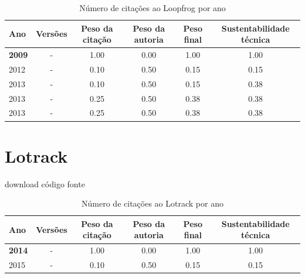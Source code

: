 \begin{table}[H]
\caption{Número de citações ao Loopfrog por ano}
\centering
\begin{tabular}{| l | c | c | c | c | c |}
  \hline
  Ano & Versões & Peso da citação & Peso da autoria & Peso final & Sustentabilidade técnica \\
  \hline
            {\bf 2009}
          &
          -
          &
          1.00
          &
          0.00
          &
          1.00
          &
            {\color{blue} 1.00}
          \\
\hline
            2012
          &
          -
          &
          0.10
          &
          0.50
          &
          0.15
          &
            {\color{red} 0.15}
          \\
\hline
            2013
          &
          -
          &
          0.10
          &
          0.50
          &
          0.15
          &
            {\color{red} 0.38}
          \\
            2013
          &
          -
          &
          0.25
          &
          0.50
          &
          0.38
          &
            {\color{red} 0.38}
          \\
            2013
          &
          -
          &
          0.25
          &
          0.50
          &
          0.38
          &
            {\color{red} 0.38}
          \\
\hline
\end{tabular}
\end{table}



\section{Lotrack}
\checkmark download
\checkmark código fonte


\begin{table}[H]
\caption{Número de citações ao Lotrack por ano}
\centering
\begin{tabular}{| l | c | c | c | c | c |}
  \hline
  Ano & Versões & Peso da citação & Peso da autoria & Peso final & Sustentabilidade técnica \\
  \hline
            {\bf 2014}
          &
          -
          &
          1.00
          &
          0.00
          &
          1.00
          &
            {\color{blue} 1.00}
          \\
\hline
            2015
          &
          -
          &
          0.10
          &
          0.50
          &
          0.15
          &
            {\color{red} 0.15}
          \\
\hline
\end{tabular}
\end{table}



